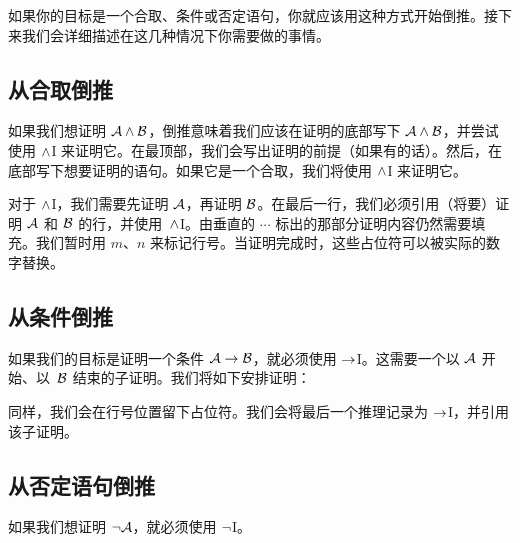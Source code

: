如果你的目标是一个合取、条件或否定语句，你就应该用这种方式开始倒推。接下来我们会详细描述在这几种情况下你需要做的事情。

\subsection*{从合取倒推}

如果我们想证明 $\mathcal{A} \wedge \mathcal{B}$，倒推意味着我们应该在证明的底部写下 $\mathcal{A} \wedge \mathcal{B}$，并尝试使用 $\wedge$I 来证明它。在最顶部，我们会写出证明的前提（如果有的话）。然后，在底部写下想要证明的语句。如果它是一个合取，我们将使用 $\wedge$I 来证明它。


\begin{fitchproof}
	\PR
	\ellipsesline
	\PR
\ellipsesline
    \ellipsesline
  \end{fitchproof}


对于 $\wedge$I，我们需要先证明 $\mathcal{A}$，再证明 $\mathcal{B}$。在最后一行，我们必须引用（将要）证明 $\mathcal{A}$ 和 $\mathcal{B}$ 的行，并使用~$\wedge$I。由垂直的 $\cdots$ 标出的那部分证明内容仍然需要填充。我们暂时用 $m$、$n$ 来标记行号。当证明完成时，这些占位符可以被实际的数字替换。

\subsection*{从条件倒推}

如果我们的目标是证明一个条件 $\mathcal{A} \rightarrow \mathcal{B}$，就必须使用 $\rightarrow$I。这需要一个以 $\mathcal{A}$ 开始、以~$\mathcal{B}$ 结束的子证明。我们将如下安排证明：


\begin{fitchproof}
\open
{}
\ellipsesline
{}
\close
{}
\end{fitchproof}


同样，我们会在行号位置留下占位符。我们会将最后一个推理记录为 $\rightarrow$I，并引用该子证明。

\subsection*{从否定语句倒推}

如果我们想证明 $\neg \mathcal{A}$，就必须使用 $\neg$I。


\begin{fitchproof}
\open
{}
\ellipsesline
{}
\close
{}
\end{fitchproof}


